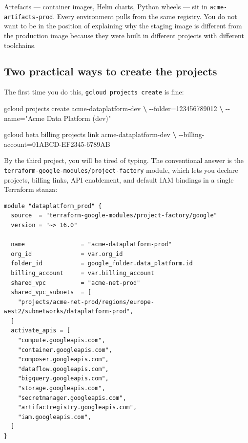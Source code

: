 \documentclass[
  11pt,
  british,
  oneside]{book}
\newenvironment{Shaded}{\begin{snugshade}}{\end{snugshade}}
\newcommand{\ExtensionTok}[1]{#1}
\newcommand{\KeywordTok}[1]{\textcolor[rgb]{0.13,0.29,0.53}{\textbf{#1}}}
\newcommand{\NormalTok}[1]{#1}
\newcommand{\StringTok}[1]{\textcolor[rgb]{0.31,0.60,0.02}{#1}}
\begin{document}
Artefacts --- container images, Helm charts, Python wheels --- sit in
\texttt{acme-artifacts-prod}. Every environment pulls from the same
registry. You do not want to be in the position of explaining why the
staging image is different from the production image because they were
built in different projects with different toolchains.

\hypertarget{two-practical-ways-to-create-the-projects}{%
\subsection{Two practical ways to create the
projects}\label{two-practical-ways-to-create-the-projects}}

The first time you do this, \texttt{gcloud\ projects\ create} is fine:

\begin{Shaded}
\begin{Highlighting}[]
\ExtensionTok{gcloud}\NormalTok{ projects create acme{-}dataplatform{-}dev }\KeywordTok{\textbackslash{}}
  \ExtensionTok{{-}{-}folder}\NormalTok{=123456789012 }\KeywordTok{\textbackslash{}}
  \ExtensionTok{{-}{-}name}\NormalTok{=}\StringTok{"Acme Data Platform (dev)"}

\ExtensionTok{gcloud}\NormalTok{ beta billing projects link acme{-}dataplatform{-}dev }\KeywordTok{\textbackslash{}}
  \ExtensionTok{{-}{-}billing{-}account}\NormalTok{=01ABCD{-}EF2345{-}6789AB}
\end{Highlighting}
\end{Shaded}

By the third project, you will be tired of typing. The conventional
answer is the \texttt{terraform-google-modules/project-factory} module,
which lets you declare projects, billing links, API enablement, and
default IAM bindings in a single Terraform stanza:

\begin{verbatim}
module "dataplatform_prod" {
  source  = "terraform-google-modules/project-factory/google"
  version = "~> 16.0"

  name                = "acme-dataplatform-prod"
  org_id              = var.org_id
  folder_id           = google_folder.data_platform.id
  billing_account     = var.billing_account
  shared_vpc          = "acme-net-prod"
  shared_vpc_subnets  = [
    "projects/acme-net-prod/regions/europe-west2/subnetworks/dataplatform-prod",
  ]
  activate_apis = [
    "compute.googleapis.com",
    "container.googleapis.com",
    "composer.googleapis.com",
    "dataflow.googleapis.com",
    "bigquery.googleapis.com",
    "storage.googleapis.com",
    "secretmanager.googleapis.com",
    "artifactregistry.googleapis.com",
    "iam.googleapis.com",
  ]
}
\end{verbatim}
\end{document}
